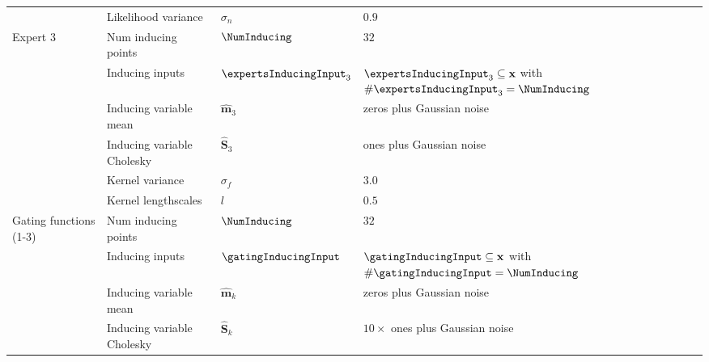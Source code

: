 \documentclass{mimosis-class/mimosis}
\numberwithin{equation}{chapter}
\newcommand{\modeInd}{\ensuremath{k}}
\newcommand{\allData}[1]{\ensuremath{\MakeUppercase{#1}}}
\newcommand{\mode}[1]{\ensuremath{#1_{\modeInd}}}
\newcommand{\x}{\ensuremath{\mathbf{x}}}
\newcommand{\allInput}{\ensuremath{\allData{\x}}}
\begin{document}
{\begin{table}
{\begin{center}
\begin{tabular}{llll}
 & Likelihood variance & \(\sigma_n\) & \(0.9\)\\
Expert 3 & Num inducing points & \(\NumInducing\) & \(32\)\\
 & Inducing inputs & \(\expertsInducingInput_3\) & \(\expertsInducingInput_3 \subseteq \allInput\) with \(\#\expertsInducingInput_3 = \NumInducing\)\\
 & Inducing variable mean & \(\hat{\mathbf{m}}_3\) & zeros plus Gaussian noise\\
 & Inducing variable Cholesky & \(\hat{\mathbf{S}}_3\) & ones plus Gaussian noise\\
\hline
 & Kernel variance & \(\sigma_f\) & \(3.0\)\\
 & Kernel lengthscales & \(l\) & \(0.5\)\\
Gating functions (1-3) & Num inducing points & \(\NumInducing\) & \(32\)\\
 & Inducing inputs & \(\gatingInducingInput\) & \(\gatingInducingInput \subseteq \allInput\) with \(\#\gatingInducingInput = \NumInducing\)\\
 & Inducing variable mean & \(\mode{\hat{\mathbf{m}}}\) & zeros plus Gaussian noise\\
 & Inducing variable Cholesky & \(\mode{\hat{\mathbf{S}}}\) & \(10 \times\) ones plus Gaussian noise\\
\hline
\end{tabular}
\end{center}
}
\end{table}

}
\end{document}

